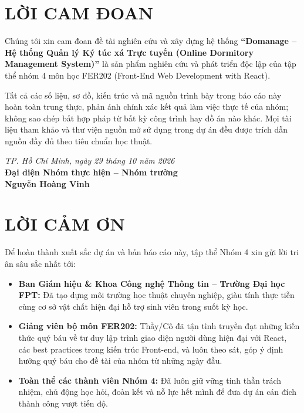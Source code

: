 \documentclass[12pt,a4paper,oneside]{report}
\begin{document}


\newpage
{}
\chapter*{LỜI CAM ĐOAN}
Chúng tôi xin cam đoan đề tài nghiên cứu và xây dựng hệ thống \textbf{``Domanage -- Hệ thống Quản lý Ký túc xá Trực tuyến (Online Dormitory Management System)''} là sản phẩm nghiên cứu và phát triển độc lập của tập thể nhóm 4 môn học FER202 (Front-End Web Development with React). 

Tất cả các số liệu, sơ đồ, kiến trúc và mã nguồn trình bày trong báo cáo này hoàn toàn trung thực, phản ánh chính xác kết quả làm việc thực tế của nhóm; không sao chép bất hợp pháp từ bất kỳ công trình hay đồ án nào khác. Mọi tài liệu tham khảo và thư viện nguồn mở sử dụng trong dự án đều được trích dẫn nguồn đầy đủ theo tiêu chuẩn học thuật.

\vspace{1.5cm}
\begin{flushright}
\textit{TP. Hồ Chí Minh, ngày 29 tháng 10 năm 2026}\\[0.3cm]
\textbf{Đại diện Nhóm thực hiện -- Nhóm trưởng}\\[1.5cm]
\textbf{Nguyễn Hoàng Vinh}
\end{flushright}

\newpage
\chapter*{LỜI CẢM ƠN}
Để hoàn thành xuất sắc dự án và bản báo cáo này, tập thể Nhóm 4 xin gửi lời tri ân sâu sắc nhất tới:
\begin{itemize}
    \item \textbf{Ban Giám hiệu \& Khoa Công nghệ Thông tin -- Trường Đại học FPT:} Đã tạo dựng môi trường học thuật chuyên nghiệp, giàu tính thực tiễn cùng cơ sở vật chất hiện đại hỗ trợ sinh viên trong suốt kỳ học.
    \item \textbf{Giảng viên bộ môn FER202:} Thầy/Cô đã tận tình truyền đạt những kiến thức quý báu về tư duy lập trình giao diện người dùng hiện đại với React, các best practices trong kiến trúc Front-end, và luôn theo sát, góp ý định hướng quý báu cho đề tài của nhóm từ những ngày đầu.
    \item \textbf{Toàn thể các thành viên Nhóm 4:} Đã luôn giữ vững tinh thần trách nhiệm, chủ động học hỏi, đoàn kết và nỗ lực hết mình để đưa dự án cán đích thành công vượt tiến độ.
\end{itemize}
\end{document}
